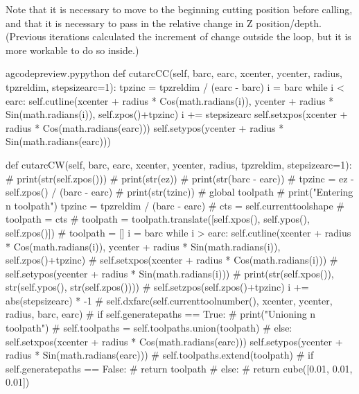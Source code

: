 \documentclass{ltxdoc}
\begin{document}

Note that it is necessary to move to the beginning cutting position before calling, and that it is necessary to pass in the relative change in Z position/depth. (Previous iterations calculated the increment of change outside the loop, but it is more workable to do so inside.)

\lstset{firstnumber=\thegcpy}
\begin{writecode}{a}{gcodepreview.py}{python}
    def cutarcCC(self, barc, earc, xcenter, ycenter, radius, tpzreldim, stepsizearc=1):
        tpzinc = tpzreldim / (earc - barc)
        i = barc
        while i < earc: 
            self.cutline(xcenter + radius * Cos(math.radians(i)), ycenter + radius * Sin(math.radians(i)), self.zpos()+tpzinc)
            i += stepsizearc
        self.setxpos(xcenter + radius * Cos(math.radians(earc)))
        self.setypos(ycenter + radius * Sin(math.radians(earc)))

    def cutarcCW(self, barc, earc, xcenter, ycenter, radius, tpzreldim, stepsizearc=1):
#        print(str(self.zpos()))
#        print(str(ez))
#        print(str(barc - earc))
#        tpzinc = ez - self.zpos() / (barc - earc)
#        print(str(tzinc))
#        global toolpath
#        print("Entering n toolpath")
        tpzinc = tpzreldim / (barc - earc)
#        cts = self.currenttoolshape
#        toolpath = cts
#        toolpath = toolpath.translate([self.xpos(), self.ypos(), self.zpos()])
#        toolpath = []
        i = barc
        while i > earc: 
            self.cutline(xcenter + radius * Cos(math.radians(i)), ycenter + radius * Sin(math.radians(i)), self.zpos()+tpzinc)
#            self.setxpos(xcenter + radius * Cos(math.radians(i)))
#            self.setypos(ycenter + radius * Sin(math.radians(i)))
#            print(str(self.xpos()), str(self.ypos(), str(self.zpos())))
#            self.setzpos(self.zpos()+tpzinc)
            i += abs(stepsizearc) * -1
#        self.dxfarc(self.currenttoolnumber(), xcenter, ycenter, radius, barc, earc)
#        if self.generatepaths == True:
#            print("Unioning n toolpath")
#            self.toolpaths = self.toolpaths.union(toolpath)
#        else:
        self.setxpos(xcenter + radius * Cos(math.radians(earc)))
        self.setypos(ycenter + radius * Sin(math.radians(earc)))
#        self.toolpaths.extend(toolpath)
#        if self.generatepaths == False:
#        return toolpath
#        else:
#            return cube([0.01, 0.01, 0.01])

\end{writecode}
\addtocounter{gcpy}{49}
\end{document}
